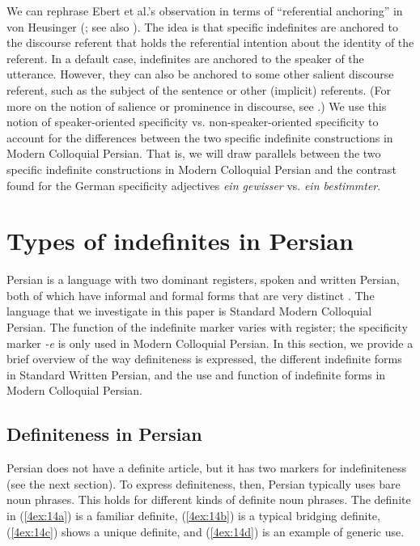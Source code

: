 \documentclass[output=paper]{langsci/langscibook}
\begin{document}
We can rephrase Ebert et al.'s observation in terms of ``referential anchoring'' in von Heusinger (\citeyear{vonheus:02url,vonheus:11url}; see also \citealt{onea:geist:11}). The idea is that specific indefinites are anchored to the discourse referent that holds the referential intention about the identity of the referent. In a default case, indefinites are anchored to the speaker of the utterance. However, they can also be anchored to some other salient discourse referent, such as the subject of the sentence or other (implicit) referents. (For more on the notion of salience or prominence in discourse, see \citealt{vonheus:schum:19}.) We use this notion of speaker-oriented specificity vs. non-speaker-oriented specificity to account for the differences between the two specific indefinite constructions in Modern Colloquial Persian. That is, we will draw parallels between the two specific indefinite constructions in Modern Colloquial Persian and the contrast found for the German specificity adjectives {\emph{ein gewisser}} vs. {\emph{ein bestimmter}}.


\section{Types of indefinites in Persian}\label{4sec:3}

Persian is a language with two dominant registers, spoken and written Persian, both of which have informal and formal forms that are very distinct \citep{jasbi:14, lazard:57, lazard:92, modarresi:18, nikravan:14, windfuhr:79}. The language that we investigate in this paper is Standard Modern Colloquial Persian. The function of the indefinite marker varies with register; the specificity marker {\emph{-e}} is only used in Modern Colloquial Persian. In this section, we provide a brief overview of the way definiteness is expressed, the different indefinite forms in Standard Written Persian, and the use and function of indefinite forms in Modern Colloquial Persian.

\subsection{Definiteness in Persian}\label{4sec:31}

Persian does not have a definite article, but it has two markers for indefiniteness (see the next section). To express definiteness, then, Persian typically uses bare noun phrases. This holds for different kinds of definite noun phrases. The definite in (\ref{4ex:14a}) is a familiar definite, (\ref{4ex:14b}) is a typical bridging definite, (\ref{4ex:14c}) shows a unique definite, and (\ref{4ex:14d}) is an example of generic use.
\end{document}
